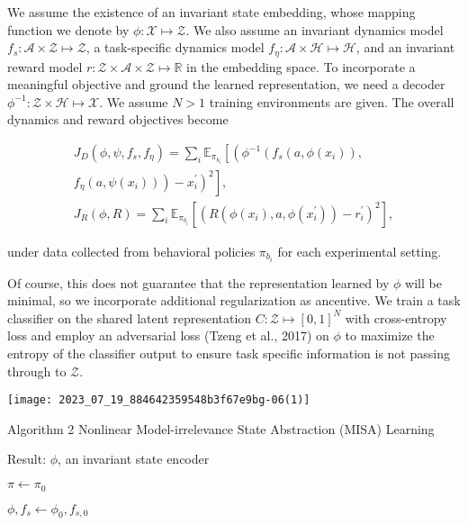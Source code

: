 \documentclass[10pt]{article}
\begin{document}
We assume the existence of an invariant state embedding, whose mapping function we denote by $\phi: \mathcal{X} \mapsto \mathcal{Z}$. We also assume an invariant dynamics model $f_{s}: \mathcal{A} \times \mathcal{Z} \mapsto \mathcal{Z}$, a task-specific dynamics model $f_{\eta}: \mathcal{A} \times \mathcal{H} \mapsto \mathcal{H}$, and an invariant reward model $r: \mathcal{Z} \times \mathcal{A} \times \mathcal{Z} \mapsto \mathbb{R}$ in the embedding space. To incorporate a meaningful objective and ground the learned representation, we need a decoder $\phi^{-1}: \mathcal{Z} \times \mathcal{H} \mapsto \mathcal{X}$. We assume $N>1$ training environments are given. The overall dynamics and reward objectives become

\[
\begin{array}{r}
J_{D}\left(\phi, \psi, f_{s}, f_{\eta}\right)=\sum_{i} \mathbb{E}_{\pi_{b_{i}}}\left[\left(\phi ^ { - 1 } \left(f_{s}\left(a, \phi\left(x_{i}\right)\right),\right.\right.\right. \\
\left.\left.\left.f_{\eta}\left(a, \psi\left(x_{i}\right)\right)\right)-x_{i}^{\prime}\right)^{2}\right], \\
J_{R}(\phi, R)=\sum_{i} \mathbb{E}_{\pi_{b_{i}}}\left[\left(R\left(\phi\left(x_{i}\right), a, \phi\left(x_{i}^{\prime}\right)\right)-r_{i}^{\prime}\right)^{2}\right],
\end{array}
\]

under data collected from behavioral policies $\pi_{b_{i}}$ for each experimental setting.

Of course, this does not guarantee that the representation learned by $\phi$ will be minimal, so we incorporate additional regularization as ancentive. We train a task classifier on the shared latent representation $C: \mathcal{Z} \mapsto[0,1]^{N}$ with cross-entropy loss and employ an adversarial loss (Tzeng et al., 2017) on $\phi$ to maximize the entropy of the classifier output to ensure task specific information is not passing through to $\mathcal{Z}$.

\begin{center}
\texttt{[image: 2023\_07\_19\_884642359548b3f67e9bg-06(1)]}
\end{center}

Algorithm 2 Nonlinear Model-irrelevance State Abstraction (MISA) Learning

Result: $\phi$, an invariant state encoder

$\pi \leftarrow \pi_{0}$

$\phi, f_{s} \leftarrow \phi_{0}, f_{s, 0}$
\end{document}
